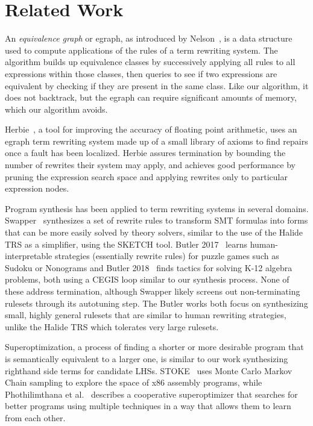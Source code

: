 \documentclass[sigplan,10pt,review,anonymous]{acmart}\settopmatter{printfolios=true,printccs=false,printacmref=false}
\begin{document}
\section{Related Work}

An \textit{equivalence graph} or egraph, as introduced by Nelson~\cite{nelson1980techniques}, is a data structure used to compute applications of the rules of a term rewriting system. The algorithm builds up equivalence classes by successively applying all rules to all expressions within those classes, then queries to see if two expressions are equivalent by checking if they are present in the same class. Like our algorithm, it does not backtrack, but the egraph can require significant amounts of memory, which our algorithm avoids.

Herbie~\cite{panchekha2015automatically}, a tool for improving the accuracy of floating point arithmetic, uses an egraph term rewriting system made up of a small library of axioms to find repairs once a fault has been localized. Herbie assures termination by bounding the number of rewrites their system may apply, and achieves good performance by pruning the expression search space and applying rewrites only to particular expression nodes. 

Program synthesis has been applied to term rewriting systems in several domains. Swapper~\cite{singh2016swapper} synthesizes a set of rewrite rules to transform SMT formulas into forms that can be more easily solved by theory solvers, similar to the use of the Halide TRS as a simplifier, using the SKETCH tool. Butler 2017~\cite{butler2017synthesizing} learns human-interpretable strategies (essentially rewrite rules) for puzzle games such as Sudoku or Nonograms and Butler 2018~\cite{butler2018framework} finds tactics for solving K-12 algebra problems, both using a CEGIS loop similar to our synthesis process. None of these address termination, although Swapper likely screens out non-terminating rulesets through its autotuning step. The Butler works both focus on synthesizing small, highly general rulesets that are similar to human rewriting strategies, unlike the Halide TRS which tolerates very large rulesets.

Superoptimization, a process of finding a shorter or more desirable program that is semantically equivalent to a larger one, is similar to our work synthesizing righthand side terms for candidate LHSs. STOKE~\cite{schkufza2013stochastic} uses Monte Carlo Markov Chain sampling to explore the space of x86 assembly programs, while Phothilimthana et al.~\cite{phothilimthana2016scaling} describes a cooperative superoptimizer that searches for better programs using multiple techniques in a way that allows them to learn from each other. 
\end{document}
